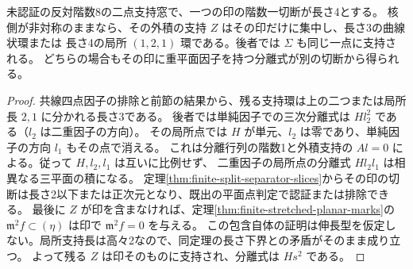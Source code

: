 \begin{corollary}\label{cor:two-support-quartic-discrepancy}
未認証の反対階数8の二点支持窓で、一つの印の階数一切断が長さ4とする。
核側が非対称のままなら、その外積の支持 $Z$ はその印だけに集中し、長さ3の曲線状環または
長さ4の局所 $(1,2,1)$ 環である。後者では $\Sigma$ も同じ一点に支持される。
どちらの場合もその印に重平面因子を持つ分離式が別の切断から得られる。
\end{corollary}
\begin{proof}
共線四点因子の排除と前節の結果から、残る支持環は上の二つまたは局所長 $2,1$ に分かれる長さ3である。
後者では単純因子での三次分離式は $H l_2^2$ である（$l_2$ は二重因子の方向）。
その局所点では $H$ が単元、$l_2$ は零であり、単純因子の方向 $l_1$ もその点で消える。
これは分離行列の階数1と外積支持の $Al=0$ による。従って $H,l_2,l_1$ は互いに比例せず、
二重因子の局所点の分離式 $H l_2 l_1$ は相異なる三平面の積になる。
定理\ref{thm:finite-split-separator-slices}からその印の切断は長さ2以下または正次元となり、既出の平面点判定で認証または排除できる。
最後に $Z$ が印を含まなければ、定理\ref{thm:finite-stretched-planar-marks}の
$\mathfrak m^2 f\subset(\eta)$ は印で $\mathfrak m^2 f=0$ を与える。
この包含自体の証明は伸長型を仮定しない。局所支持長は高々2なので、同定理の長さ下界との矛盾がそのまま成り立つ。
よって残る $Z$ は印そのものに支持され、分離式は $H s^2$ である。
\end{proof}
